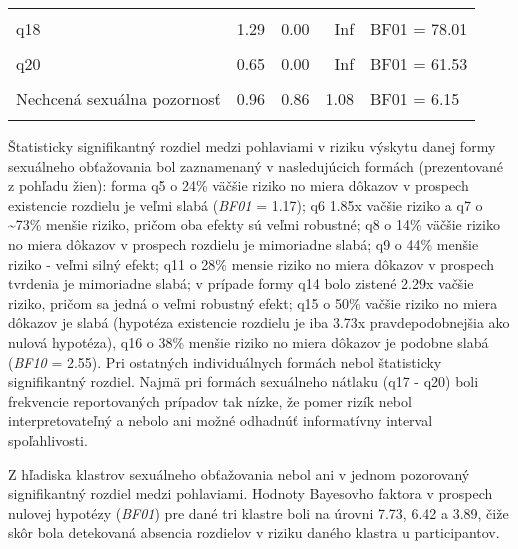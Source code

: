 \documentclass[
]{article}
\begin{document}
\begin{table}[H]
{\begin{tabular}[t]{lrrrl}
\cellcolor{gray!6}{q17} & \cellcolor{gray!6}{0.52} & \cellcolor{gray!6}{0.26} & \cellcolor{gray!6}{1.01} & \cellcolor{gray!6}{BF01 = 3.5}\\
q18 & 1.29 & 0.00 & Inf & BF01 = 78.01\\
\cellcolor{gray!6}{q19} & \cellcolor{gray!6}{0.64} & \cellcolor{gray!6}{0.00} & \cellcolor{gray!6}{Inf} & \cellcolor{gray!6}{BF01 = 60.89}\\
q20 & 0.65 & 0.00 & Inf & BF01 = 61.53\\
\addlinespace
\cellcolor{gray!6}{Rodovo motivované obťažovanie} & \cellcolor{gray!6}{0.98} & \cellcolor{gray!6}{0.93} & \cellcolor{gray!6}{1.04} & \cellcolor{gray!6}{BF01 = 7.73}\\
Nechcená sexuálna pozornosť & 0.96 & 0.86 & 1.08 & BF01 = 6.15\\
\cellcolor{gray!6}{Sexuálny nátlak} & \cellcolor{gray!6}{0.56} & \cellcolor{gray!6}{0.29} & \cellcolor{gray!6}{1.04} & \cellcolor{gray!6}{BF01 = 3.84}\\
\bottomrule
\end{tabular}}
\end{table}

Štatisticky signifikantný rozdiel medzi pohlaviami v riziku výskytu danej formy sexuálneho obťažovania bol zaznamenaný v nasledujúcich formách (prezentované z pohľadu žien): forma q5 o 24\% väčšie riziko no miera dôkazov v prospech existencie rozdielu je veľmi slabá (\emph{BF01} = 1.17); q6 1.85x vačšie riziko a q7 o \textasciitilde73\% menšie riziko, pričom oba efekty sú veľmi robustné; q8 o 14\% väčšie riziko no miera dôkazov v prospech rozdielu je mimoriadne slabá; q9 o 44\% menšie riziko - veľmi silný efekt; q11 o 28\% mensie riziko no miera dôkazov v prospech tvrdenia je mimoriadne slabá; v prípade formy q14 bolo zistené 2.29x vačšie riziko, pričom sa jedná o veľmi robustný efekt; q15 o 50\% vačšie riziko no miera dôkazov je slabá (hypotéza existencie rozdielu je iba 3.73x pravdepodobnejšia ako nulová hypotéza), q16 o 38\% menšie riziko no miera dôkazov je podobne slabá (\emph{BF10} = 2.55). Pri ostatných individuálnych formách nebol štatisticky signifikantný rozdiel. Najmä pri formách sexuálneho nátlaku (q17 - q20) boli frekvencie reportovaných prípadov tak nízke, že pomer rizík nebol interpretovateľný a nebolo ani možné odhadnúť informatívny interval spoľahlivosti.

Z hľadiska klastrov sexuálneho obťažovania nebol ani v jednom pozorovaný signifikantný rozdiel medzi pohlaviami. Hodnoty Bayesovho faktora v prospech nulovej hypotézy (\emph{BF01}) pre dané tri klastre boli na úrovni 7.73, 6.42 a 3.89, čiže skôr bola detekovaná absencia rozdielov v riziku daného klastra u participantov.
\end{document}
